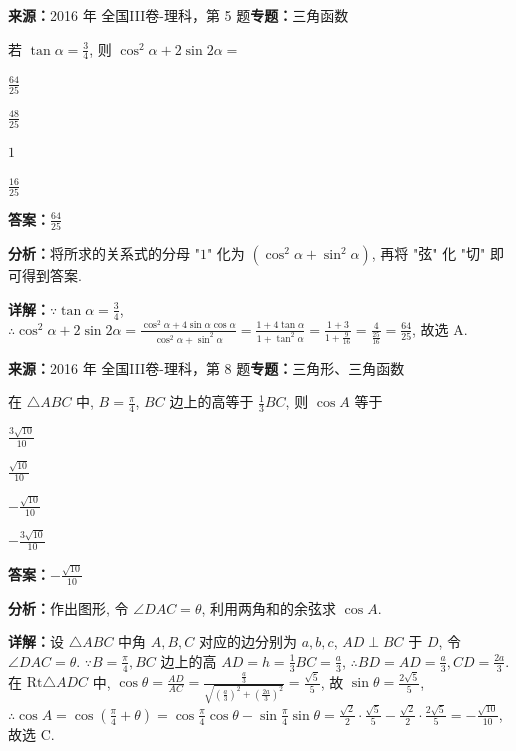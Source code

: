\begin{question}[points=5]
\textbf{来源：}2016 年 全国III卷-理科，第 5 题\quad \textbf{专题：}三角函数\par
若 $\tan\alpha=\frac{3}{4}$, 则 $\cos^2\alpha+2\sin2\alpha=$
\begin{choices}
  \item $\frac{64}{25}$
  \item $\frac{48}{25}$
  \item $1$
  \item $\frac{16}{25}$
\end{choices}
\begin{solution}
\textbf{答案：}$\frac{64}{25}$

\textbf{分析：}将所求的关系式的分母 "$1$" 化为 $(\cos^2\alpha+\sin^2\alpha)$, 再将 "弦" 化 "切" 即可得到答案.

\textbf{详解：}$\because\tan\alpha=\frac{3}{4}$, $\therefore\cos^2\alpha+2\sin2\alpha=\frac{\cos^2\alpha+4\sin\alpha\cos\alpha}{\cos^2\alpha+\sin^2\alpha}=\frac{1+4\tan\alpha}{1+\tan^2\alpha}=\frac{1+3}{1+\frac{9}{16}}=\frac{4}{\frac{25}{16}}=\frac{64}{25}$, 故选 A.
\end{solution}
\end{question}

\begin{question}[points=5]
\textbf{来源：}2016 年 全国III卷-理科，第 8 题\quad \textbf{专题：}三角形、三角函数\par
在 $\triangle ABC$ 中, $B=\frac{\pi}{4}$, $BC$ 边上的高等于 $\frac{1}{3}BC$, 则 $\cos A$ 等于
\begin{choices}
  \item $\frac{3\sqrt{10}}{10}$
  \item $\frac{\sqrt{10}}{10}$
  \item $-\frac{\sqrt{10}}{10}$
  \item $-\frac{3\sqrt{10}}{10}$
\end{choices}
\begin{solution}
\textbf{答案：}$-\frac{\sqrt{10}}{10}$

\textbf{分析：}作出图形, 令 $\angle DAC=\theta$, 利用两角和的余弦求 $\cos A$.

\textbf{详解：}设 $\triangle ABC$ 中角 $A,B,C$ 对应的边分别为 $a,b,c$, $AD\perp BC$ 于 $D$, 令 $\angle DAC=\theta$. $\because B=\frac{\pi}{4}, BC$ 边上的高 $AD=h=\frac{1}{3}BC=\frac{a}{3}$, $\therefore BD=AD=\frac{a}{3}, CD=\frac{2a}{3}$. 在 $\mathrm{Rt}\triangle ADC$ 中, $\cos\theta=\frac{AD}{AC}=\frac{\frac{a}{3}}{\sqrt{(\frac{a}{3})^2+(\frac{2a}{3})^2}}=\frac{\sqrt{5}}{5}$, 故 $\sin\theta=\frac{2\sqrt{5}}{5}$, $\therefore \cos A=\cos(\frac{\pi}{4}+\theta)=\cos\frac{\pi}{4}\cos\theta-\sin\frac{\pi}{4}\sin\theta=\frac{\sqrt{2}}{2}\cdot\frac{\sqrt{5}}{5}-\frac{\sqrt{2}}{2}\cdot\frac{2\sqrt{5}}{5}=-\frac{\sqrt{10}}{10}$, 故选 C.
\end{solution}
\end{question}

